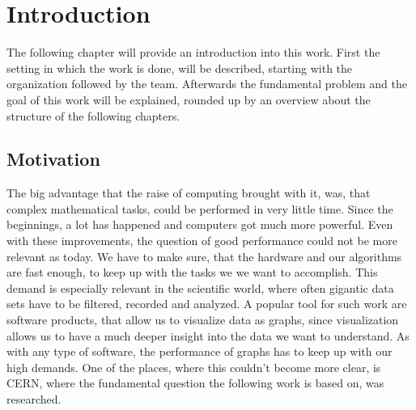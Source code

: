 
\chapter{Introduction}
\label{ch:Introduction}

The following chapter will provide an introduction into this work. First the
setting in which the work is done, will be described, starting with the
organization followed by the team. Afterwards the fundamental problem and the
goal of this work will be explained, rounded up by an overview about the
structure of the following chapters.





\section{Motivation}
\label{sec:Introduction:Motivation}

The big advantage that the raise of computing brought with it, was, that complex
mathematical tasks, could be performed in very little time. Since the
beginnings, a lot has happened and computers got much more powerful. Even with
these improvements, the question of good performance could not be more relevant
as today. We have to make sure, that the hardware and our algorithms are fast
enough, to keep up with the tasks we we want to accomplish. This demand is
especially relevant in the scientific world, where often gigantic data sets have
to be filtered, recorded and analyzed. A popular tool for such work are software
products, that allow us to visualize data as graphs, since visualization allows
us to have a much deeper insight into the data we want to understand. As with
any type of software, the performance of graphs has to keep up with our high
demands. One of the places, where this couldn't become more clear, is CERN,
where the fundamental question the following work is based on, was researched.





